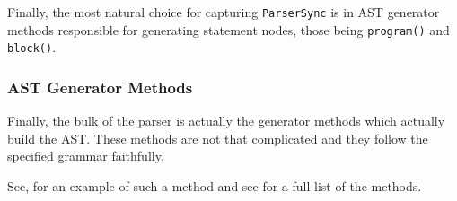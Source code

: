 

Finally, the most natural choice for capturing
\texttt{ParserSync} is in AST generator methods responsible for
generating statement nodes, those being \texttt{program()} and
\texttt{block()}.

\subsubsection{AST Generator Methods}

Finally, the bulk of the parser is actually the generator
methods which actually build the AST. These methods are not that
complicated and they follow the specified grammar faithfully.

See,  for an example of such a method and see
 for a full list of the methods.



